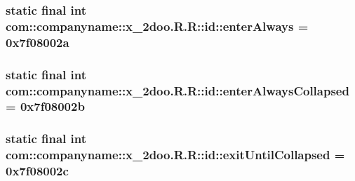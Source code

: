 \hypertarget{classcom_1_1companyname_1_1x__2doo_1_1_r_1_1id_2f1508f638d6cd9ef500c344fbe4ee9c}{
\subsubsection[{enterAlways}]{\setlength{\rightskip}{0pt plus 5cm}static final int com::companyname::x\_\-2doo.R.R::id::enterAlways = 0x7f08002a}}
\label{classcom_1_1companyname_1_1x__2doo_1_1_r_1_1id_2f1508f638d6cd9ef500c344fbe4ee9c}


\hypertarget{classcom_1_1companyname_1_1x__2doo_1_1_r_1_1id_899b0b7b2942a137fc08ee704a7f8e94}{
\subsubsection[{enterAlwaysCollapsed}]{\setlength{\rightskip}{0pt plus 5cm}static final int com::companyname::x\_\-2doo.R.R::id::enterAlwaysCollapsed = 0x7f08002b}}
\label{classcom_1_1companyname_1_1x__2doo_1_1_r_1_1id_899b0b7b2942a137fc08ee704a7f8e94}


\hypertarget{classcom_1_1companyname_1_1x__2doo_1_1_r_1_1id_06b7a7bd9e9c94a7baf3a2b9e284502c}{
\subsubsection[{exitUntilCollapsed}]{\setlength{\rightskip}{0pt plus 5cm}static final int com::companyname::x\_\-2doo.R.R::id::exitUntilCollapsed = 0x7f08002c}}
\label{classcom_1_1companyname_1_1x__2doo_1_1_r_1_1id_06b7a7bd9e9c94a7baf3a2b9e284502c}


